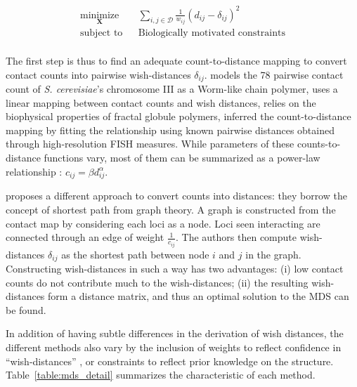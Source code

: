 \documentclass[letterpaper,12pt]{article}
\newcommand{\Xb}{\textbf{X}}
\begin{document}
\begin{equation*}
\renewcommand{\arraystretch}{2}
\begin{array}{ccl}
\underset{\Xb}{\text{minimize}} & & \underset{i, j \in \mathcal{D}}{\sum}
\frac{1}{w_{ij}} (d_{ij} - \delta_{ij})^2 \\
\text{subject to} & & \text{Biologically motivated constraints} \\
\end{array}
\end{equation*}


The first step is thus to find an adequate count-to-distance mapping to
convert contact counts into pairwise wish-distances $\delta_{ij}$.
\citet{dekker:capturing} models the 78 pairwise contact count of {\em S.
cerevisiae}'s chromosome III as a Worm-like chain polymer,
\citet{duan:three-dimensional} uses a linear mapping between contact counts
and wish distances, \citet{ay:three-dimensional} relies on the biophysical
properties of fractal globule polymers, \citet{tanizawa:mapping} inferred the
count-to-distance mapping by fitting the relationship using known pairwise
distances obtained through high-resolution FISH measures. While parameters of
these counts-to-distance functions vary, most of them can be summarized as a
power-law relationship : $c_{ij} = \beta d_{ij}^\alpha$.

\citet{lesne:3d} proposes a different approach to convert counts into
distances: they borrow the concept of shortest path from graph theory. A
graph is constructed from the contact map by considering each loci as a node.
Loci seen interacting are connected through an edge of weight
$\frac{1}{c_{ij}}$. The authors then compute wish-distances $\delta_{ij}$ as
the shortest path between node $i$ and $j$ in the graph. Constructing
wish-distances in such a way has two advantages: (i) low contact counts do not
contribute much to the wish-distances; (ii) the resulting wish-distances form
a distance matrix, and thus an optimal solution to the MDS can be found.


In addition of having subtle differences in the derivation of wish distances,
the different methods also vary by the inclusion of weights to reflect
confidence in ``wish-distances'' \citep{ay:three-dimensional}, or constraints
to reflect prior knowledge on the structure. Table~\ref{table:mds_detail}
summarizes the characteristic of each method.
\end{document}
